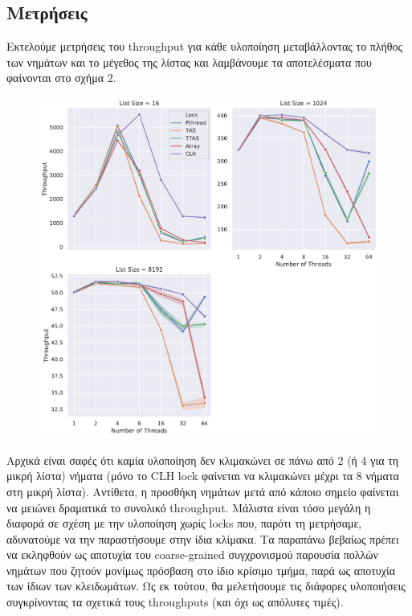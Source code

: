 \documentclass[12pt,titlepage]{article}
\begin{document}
\subsection{Μετρήσεις}

Εκτελούμε μετρήσεις του throughput για κάθε υλοποίηση μεταβάλλοντας το πλήθος
των νημάτων και το μέγεθος της λίστας και λαμβάνουμε τα αποτελέσματα που
φαίνονται στο σχήμα 2.

\begin{figure}[h!]
    \includegraphics[width=\textwidth]{z2.pdf}
    \caption{}
\end{figure}

Αρχικά είναι σαφές ότι καμία υλοποίηση δεν κλιμακώνει σε πάνω από 2 (ή 4 για τη
μικρή λίστα) νήματα (μόνο το CLH lock φαίνεται να κλιμακώνει μέχρι τα 8 νήματα
στη μικρή λίστα). Αντίθετα, η προσθήκη νημάτων μετά από κάποιο σημείο φαίνεται
να μειώνει δραματικά το συνολικό throughput. Μάλιστα είναι τόσο μεγάλη η διαφορά
σε σχέση με την υλοποίηση χωρίς locks που, παρότι τη μετρήσαμε, αδυνατούμε να
την παραστήσουμε στην ίδια κλίμακα. Τα παραπάνω βεβαίως πρέπει να εκληφθούν ως
αποτυχία του coarse-grained συγχρονισμού παρουσία πολλών νημάτων που ζητούν
μονίμως πρόσβαση στο ίδιο κρίσιμο τμήμα, παρά ως αποτυχία των ίδιων των
κλειδωμάτων. Ως εκ τούτου, θα μελετήσουμε τις διάφορες υλοποιήσεις συγκρίνοντας
τα σχετικά τους throughputs (και όχι ως απόλυτες τιμές).
\end{document}
